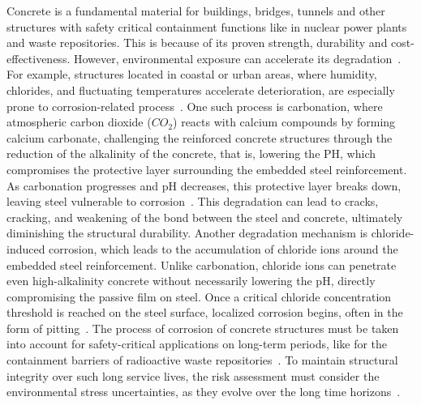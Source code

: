 
Concrete is a fundamental material for buildings, bridges, tunnels and other structures with safety critical containment functions like in nuclear power plants and waste repositories.
This is because of its proven strength, durability and cost-effectiveness.
However, environmental exposure can accelerate its degradation~\cite{GLASSER2008226}. For example, structures located in coastal or urban areas, where humidity, chlorides, and fluctuating temperatures accelerate deterioration, are especially prone to corrosion-related process~\cite{qu2021durability}.
One such process is carbonation, where atmospheric carbon dioxide ($CO_2$) reacts with calcium compounds by forming calcium carbonate, challenging the reinforced concrete structures through the reduction of the alkalinity of the concrete, that is, lowering the PH, which compromises the protective layer surrounding the embedded steel reinforcement.
As carbonation progresses and pH decreases, this protective layer breaks down, leaving steel vulnerable to corrosion~\cite{carbonation}.
This degradation can lead to cracks, cracking, and weakening of the bond between the steel and concrete, ultimately diminishing the structural durability.
Another degradation mechanism is chloride-induced corrosion, which leads to the accumulation of chloride ions around the embedded steel reinforcement. Unlike carbonation, chloride ions can penetrate even high-alkalinity concrete without necessarily lowering the pH, directly compromising the passive film on steel.
Once a critical chloride concentration threshold is reached on the steel surface, localized corrosion begins, often in the form of pitting~\cite{shi2012durability}.
The process of corrosion of concrete structures must be taken into account for safety-critical applications on long-term periods, like for the containment barriers of radioactive waste repositories~\cite{walton1990models}.
To maintain structural integrity over such long service lives, the risk assessment must consider the environmental stress uncertainties, as they evolve over the long time horizons~\cite{lindborg2018climate}.
\\

